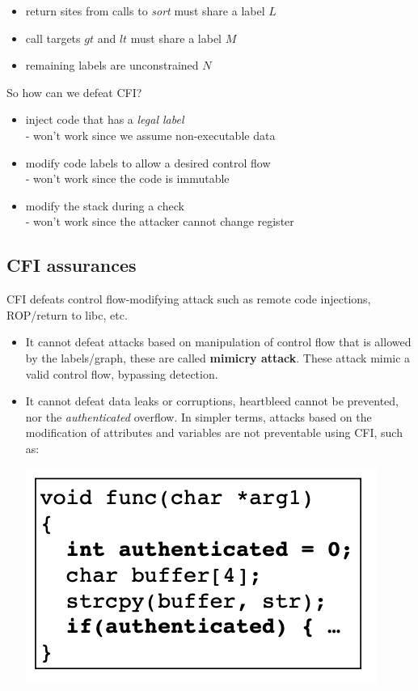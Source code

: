 \documentclass[11pt, oneside]{article}   	%
\begin{document}
\begin{itemize}
\item return sites from calls to \emph{sort} must share a label $L$
\item call targets $gt$ and $lt$ must share a label $M$
\item remaining labels are unconstrained $N$
\end{itemize} 
So how can we defeat CFI?
\begin{itemize}
\item inject code that has a \emph{legal label}\\
- won't work since we assume non-executable data
\item modify code labels to allow a desired control flow\\
- won't work since the code is immutable
\item modify the stack during a check\\
- won't work since the attacker cannot change register 
\end{itemize}
\subsection*{CFI assurances}
CFI defeats control flow-modifying attack such as remote code injections, ROP/return to libc, etc.
\begin{itemize}
\item It cannot defeat attacks based on manipulation of control flow that is allowed by the labels/graph, these are called \textbf{mimicry attack}. These attack mimic a valid control flow, bypassing detection.\item It cannot defeat data leaks or corruptions, heartbleed cannot be prevented, nor the \emph{authenticated} overflow. In simpler terms, attacks based on the modification of attributes and variables are not preventable using CFI, such as:
\begin{center}
\includegraphics[scale = 0.6]{cfia}
\end{center}
\end{itemize}
\end{document}
